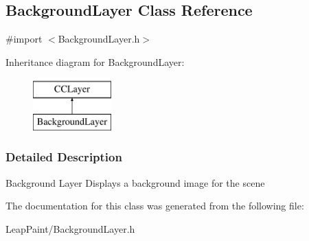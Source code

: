 \hypertarget{interface_background_layer}{\subsection{Background\-Layer Class Reference}
\label{d0/d09/interface_background_layer}
}


{\ttfamily \#import $<$Background\-Layer.\-h$>$}

Inheritance diagram for Background\-Layer\-:\begin{figure}[H]
\begin{center}
\leavevmode
\includegraphics[height=2.000000cm]{d0/d09/interface_background_layer}
\end{center}
\end{figure}


\subsubsection{Detailed Description}
Background Layer Displays a background image for the scene 

The documentation for this class was generated from the following file\-:\begin{DoxyCompactItemize}
\item 
Leap\-Paint/Background\-Layer.\-h\end{DoxyCompactItemize}
